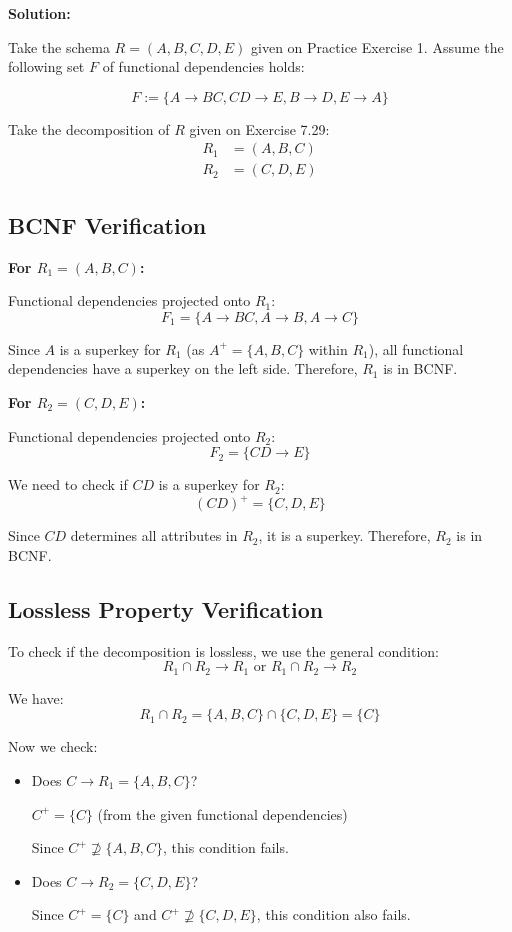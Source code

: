 \documentclass[12pt,a4paper]{article}
\begin{document}
\textbf{Solution:}

Take the schema $R = (A, B, C, D, E)$ given on Practice Exercise 1. Assume the following set $F$ of functional dependencies holds:

$$F := \{A \rightarrow BC, CD \rightarrow E, B \rightarrow D, E \rightarrow A\}$$

Take the decomposition of $R$ given on Exercise 7.29:
\begin{align}
R_1 &= (A, B, C) \\
R_2 &= (C, D, E)
\end{align}

\subsection{BCNF Verification}

\textbf{For $R_1 = (A, B, C)$:}

Functional dependencies projected onto $R_1$:
$$F_1 = \{A \rightarrow BC, A \rightarrow B, A \rightarrow C\}$$

Since $A$ is a superkey for $R_1$ (as $A^+ = \{A, B, C\}$ within $R_1$), all functional dependencies have a superkey on the left side. Therefore, $R_1$ is in BCNF.

\textbf{For $R_2 = (C, D, E)$:}

Functional dependencies projected onto $R_2$:
$$F_2 = \{CD \rightarrow E\}$$

We need to check if $CD$ is a superkey for $R_2$:
$$(CD)^+ = \{C, D, E\}$$

Since $CD$ determines all attributes in $R_2$, it is a superkey. Therefore, $R_2$ is in BCNF.

\subsection{Lossless Property Verification}

To check if the decomposition is lossless, we use the general condition:
$$R_1 \cap R_2 \rightarrow R_1 \text{ or } R_1 \cap R_2 \rightarrow R_2$$

We have:
$$R_1 \cap R_2 = \{A, B, C\} \cap \{C, D, E\} = \{C\}$$

Now we check:
\begin{itemize}
    \item Does $C \rightarrow R_1 = \{A, B, C\}$? 
    
    $C^+ = \{C\}$ (from the given functional dependencies)
    
    Since $C^+ \not\supseteq \{A, B, C\}$, this condition fails.
    
    \item Does $C \rightarrow R_2 = \{C, D, E\}$?
    
    Since $C^+ = \{C\}$ and $C^+ \not\supseteq \{C, D, E\}$, this condition also fails.
\end{itemize}
\end{document}
